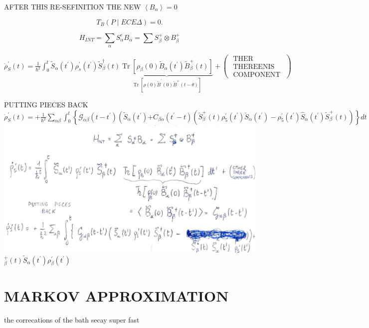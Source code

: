 \documentclass[10pt]{article}
\begin{document}
AFTER THIS RE-SEFINITION THE NEW $\left\langle B_{\alpha}\right\rangle=0$

$$
T_{B}(P \mid E C E \Delta)=0 .
$$

$$
H_{I N T}=\sum_{\alpha} S_{\alpha}^{e} B_{\alpha}=\sum S_{\beta}^{+} \otimes B_{\beta}^{+}
$$

$\dot{\rho}_{S}^{\prime}(t)=\frac{1}{\hbar^{2}} \int_{0}^{t} \tilde{S}_{\alpha}\left(t^{\prime}\right) \rho_{s}^{\prime}\left(t^{\prime}\right) \tilde{S}_{\beta}^{\dagger}(t) \underbrace{\operatorname{Tr}\left[\rho_{\beta}(0) \tilde{B}_{\alpha}\left(t^{\prime}\right) \tilde{B}_{\beta}^{+}(t)\right]}_{\operatorname{Tr}\left[\rho(0) \tilde{B}^{\prime}(0) \tilde{B}^{+}(t-\theta)\right]}+\left(\begin{array}{c}\text { THER } \\ \text { THEREENIS } \\ \text { COMPONENT }\end{array}\right)$

PUTTING PIECES BACK\\
$\dot{\rho}_{S}^{\prime}(t)=+\frac{1}{\hbar^{2}} \sum_{\alpha \beta} \int_{0}^{t}\left\{\mathcal{G}_{\alpha \beta}\left(t-t^{\prime}\right)\left(\tilde{S}_{\alpha}\left(t^{\prime}\right)\right.\right. \left.+C_{\beta \alpha}\left(t^{\prime}-t\right)\left(\breve{S}_{\beta}^{+}(t) \rho_{5}^{\prime}\left(t^{\prime}\right) \breve{S}_{\alpha}\left(t^{\prime}\right)-\rho_{5}^{\prime}\left(t^{\prime}\right) \widehat{S}_{\alpha}\left(t^{\prime}\right) \tilde{S}_{\beta}^{+}(t)\right)\right\} d t$\\
\includegraphics[max width=\textwidth]{2025_10_16_1bd50d0393172dac5e59g-07} ${ }_{\beta}^{+}(t) \tilde{S}_{\alpha}\left(t^{\prime}\right) \rho_{\beta}^{\prime}\left(t^{\prime}\right)$

\section*{MARKOV APPROXIMATION}
the correcations of the bath secay super fast
\end{document}

